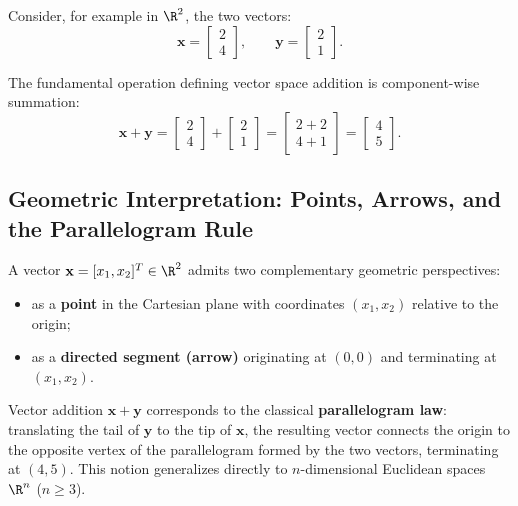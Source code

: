 Consider, for example in $\R^2$, the two vectors:
\begin{equation}
    \mathbf{x} = \begin{bmatrix} 2 \\ 4 \end{bmatrix}, \qquad \mathbf{y} = \begin{bmatrix} 2 \\ 1 \end{bmatrix}.
\end{equation}

The fundamental operation defining vector space addition is component-wise summation:
\begin{equation}
    \mathbf{x} + \mathbf{y} = \begin{bmatrix} 2 \\ 4 \end{bmatrix} + \begin{bmatrix} 2 \\ 1 \end{bmatrix} = \begin{bmatrix} 2+2 \\ 4+1 \end{bmatrix} = \begin{bmatrix} 4 \\ 5 \end{bmatrix}.
\end{equation}

\subsection{Geometric Interpretation: Points, Arrows, and the Parallelogram Rule}

A vector $\mathbf{x} = [x_1, x_2]^T \in \R^2$ admits two complementary geometric perspectives:
\begin{itemize}
    \item as a \textbf{point} in the Cartesian plane with coordinates $(x_1, x_2)$ relative to the origin;
    \item as a \textbf{directed segment (arrow)} originating at $(0,0)$ and terminating at $(x_1, x_2)$.
\end{itemize}

Vector addition $\mathbf{x} + \mathbf{y}$ corresponds to the classical \textbf{parallelogram law}: translating the tail of $\mathbf{y}$ to the tip of $\mathbf{x}$, the resulting vector connects the origin to the opposite vertex of the parallelogram formed by the two vectors, terminating at $(4, 5)$. This notion generalizes directly to $n$-dimensional Euclidean spaces $\R^n$ ($n \ge 3$).

